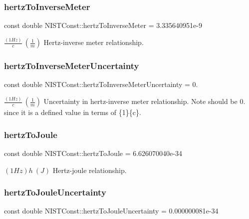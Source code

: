 \subsubsection{\texorpdfstring{hertz\+To\+Inverse\+Meter}{hertzToInverseMeter}}
{\footnotesize\ttfamily const double N\+I\+S\+T\+Const\+::hertz\+To\+Inverse\+Meter = 3.\+335640951e-\/9}

$\frac{(1 Hz)}{c} \ (\frac{1}{m})$ Hertz-\/inverse meter relationship. \mbox{\label{group___hertz_ga4a12fd74059017b7f715ed732182c47b}} 
\subsubsection{\texorpdfstring{hertz\+To\+Inverse\+Meter\+Uncertainty}{hertzToInverseMeterUncertainty}}
{\footnotesize\ttfamily const double N\+I\+S\+T\+Const\+::hertz\+To\+Inverse\+Meter\+Uncertainty = 0.}

$\frac{(1 Hz)}{c} \ (\frac{1}{m})$ Uncertainty in hertz-\/inverse meter relationship. Note should be 0. since it is a defined value in terms of \{1\}\{c\}. \mbox{\label{group___hertz_ga827c4e99287fcd5363fabcfe1381cc37}} 
\subsubsection{\texorpdfstring{hertz\+To\+Joule}{hertzToJoule}}
{\footnotesize\ttfamily const double N\+I\+S\+T\+Const\+::hertz\+To\+Joule = 6.\+626070040e-\/34}

$(1 Hz)h \ (J)$ Hertz-\/joule relationship. \mbox{\label{group___hertz_ga6fde96f31fcfe10060d6996d0d5ff117}} 
\subsubsection{\texorpdfstring{hertz\+To\+Joule\+Uncertainty}{hertzToJouleUncertainty}}
{\footnotesize\ttfamily const double N\+I\+S\+T\+Const\+::hertz\+To\+Joule\+Uncertainty = 0.\+000000081e-\/34}

